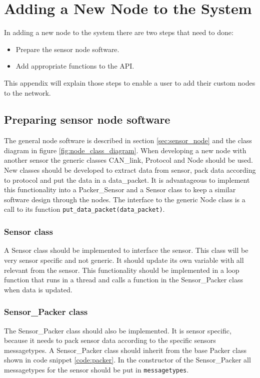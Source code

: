 \section{Adding a New Node to the System}
\label{app:addnode}
In adding a new node to the system there are two steps that need to done:
\begin{itemize}
	\item Prepare the sensor node software.
	\item Add appropriate functions to the API.
\end{itemize}
This appendix will explain those steps to enable a user to add their custom nodes to the network.

\subsection{Preparing sensor node software}\label{sec:node_implementation_guide}
The general node software is described in section \ref{sec:sensor_node} and the class diagram in figure \ref{fig:node_class_diagram}.
When developing a new node with another sensor the generic classes CAN\_link, Protocol and Node should be used. 
New classes should be developed to extract data from sensor, pack data according to protocol and put the data in a data\_packet.
It is advantageous to implement this functionality into a Packer\_Sensor and a Sensor class to keep a similar software design through the nodes.
The interface to the generic Node class is a call to its function \texttt{put\_data\_packet(data\_packet)}.

\subsubsection*{Sensor class}
A Sensor class should be implemented to interface the sensor. 
This class will be very sensor specific and not generic. 
It should update its own variable with all relevant from the sensor.
This functionality should be implemented in a loop function that runs in a thread and calls a function in the Sensor\_Packer class when data is updated.


\subsubsection*{Sensor\_Packer class}
The Sensor\_Packer class should also be implemented.
It is sensor specific, because it needs to pack sensor data according to the specific sensors messagetypes.
A Sensor\_Packer class should inherit from the base Packer class shown in code snippet \ref{code:packer}.
In the constructor of the Sensor\_Packer all messagetypes for the sensor should be put in \texttt{messagetypes}.

